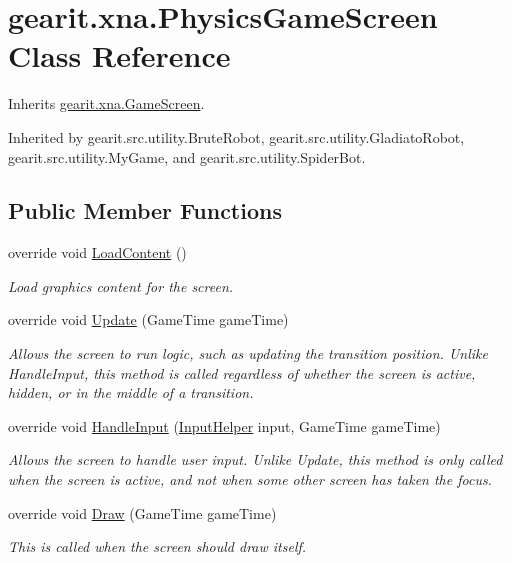 \hypertarget{classgearit_1_1xna_1_1_physics_game_screen}{\section{gearit.\+xna.\+Physics\+Game\+Screen Class Reference}
\label{classgearit_1_1xna_1_1_physics_game_screen}
}


Inherits \hyperlink{classgearit_1_1xna_1_1_game_screen}{gearit.\+xna.\+Game\+Screen}.



Inherited by gearit.\+src.\+utility.\+Brute\+Robot, gearit.\+src.\+utility.\+Gladiato\+Robot, gearit.\+src.\+utility.\+My\+Game, and gearit.\+src.\+utility.\+Spider\+Bot.

\subsection*{Public Member Functions}
\begin{DoxyCompactItemize}
\item 
override void \hyperlink{classgearit_1_1xna_1_1_physics_game_screen_a902ae9fff35a62621f5de9def0acc805}{Load\+Content} ()
\begin{DoxyCompactList}\small\item\em Load graphics content for the screen. \end{DoxyCompactList}\item 
override void \hyperlink{classgearit_1_1xna_1_1_physics_game_screen_a2a1148ee32c0ae8649eac17c55ad2190}{Update} (Game\+Time game\+Time)
\begin{DoxyCompactList}\small\item\em Allows the screen to run logic, such as updating the transition position. Unlike Handle\+Input, this method is called regardless of whether the screen is active, hidden, or in the middle of a transition. \end{DoxyCompactList}\item 
override void \hyperlink{classgearit_1_1xna_1_1_physics_game_screen_a2ef66f8d93dc4e4d6eec880fe308e0b5}{Handle\+Input} (\hyperlink{classgearit_1_1xna_1_1_input_helper}{Input\+Helper} input, Game\+Time game\+Time)
\begin{DoxyCompactList}\small\item\em Allows the screen to handle user input. Unlike Update, this method is only called when the screen is active, and not when some other screen has taken the focus. \end{DoxyCompactList}\item 
override void \hyperlink{classgearit_1_1xna_1_1_physics_game_screen_a7ef13b676ea43fa6bed07daef39e175d}{Draw} (Game\+Time game\+Time)
\begin{DoxyCompactList}\small\item\em This is called when the screen should draw itself. \end{DoxyCompactList}\end{DoxyCompactItemize}
